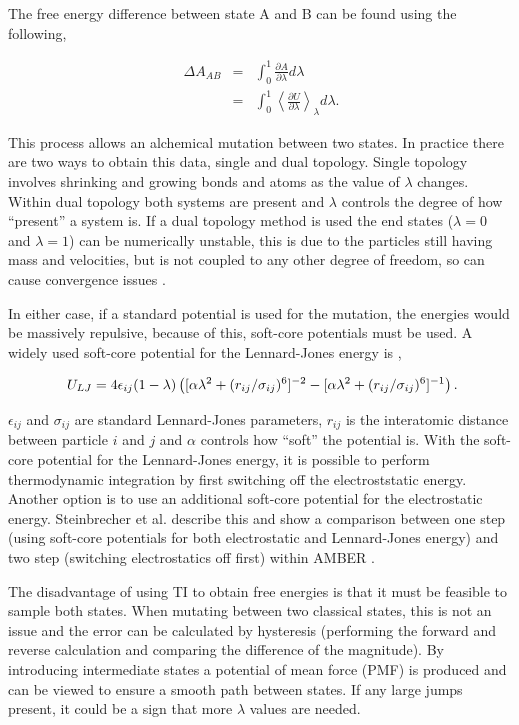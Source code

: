 The free energy difference between state A and B can be found using the following,

\begin{eqnarray}
\ \Delta A_{AB} &=& \int_{0}^{1} \frac{\partial A}{\partial \lambda} d \lambda \\
\ &=& \int_{0}^{1} \left\langle \frac{\partial U}{\partial \lambda} \right\rangle_{\lambda} d \lambda .
\end{eqnarray}

This process allows an alchemical mutation between two states.  In practice there are two ways to obtain this data, single and dual topology.  Single topology involves shrinking and growing bonds and atoms as the value of $\lambda$ changes.  Within dual topology both systems are present and $\lambda$ controls the degree of how ``present'' a system is.  If a dual topology method is used the end states ($\lambda=0$ and $\lambda=1$) can be numerically unstable, this is due to the particles still having mass and velocities, but is not coupled to any other degree of freedom, so can cause convergence issues \cite{Simulate_Phys_world}.

In either case, if a standard potential is used for the mutation, the energies would be massively repulsive, because of this, soft-core potentials must be used.  A widely used soft-core potential for the Lennard-Jones energy is \cite{one_and_two_step_ti},

\begin{equation}
\ U_{LJ} = 4 \epsilon_{ij} (1-\lambda) \left( [\alpha \lambda^2 + (r_{ij}/\sigma_{ij})^6 ] ^{-2}- [ \alpha \lambda^{2} + (r_{ij}/\sigma_{ij})^{6}]^{-1} \right) \\.
\end{equation}

$\epsilon_{ij}$ and $\sigma_{ij}$ are standard Lennard-Jones parameters, $r_{ij}$ is the interatomic distance between particle $i$ and $j$ and $\alpha$ controls how ``soft'' the potential is.  With the soft-core potential for the Lennard-Jones energy, it is possible to perform thermodynamic integration by first switching off the electroststatic energy.  Another option is to use an additional soft-core potential for the electrostatic energy.  Steinbrecher et al. \cite{one_and_two_step_ti} describe this and show a comparison between one step (using soft-core potentials for both electrostatic and Lennard-Jones energy) and two step (switching electrostatics off first) within AMBER \cite{amber_ref}.

The disadvantage of using TI to obtain free energies is that it must be feasible to sample both states.  When mutating between two classical states, this is not an issue and the error can be calculated by hysteresis (performing the forward and reverse calculation and comparing the difference of the magnitude).  By introducing intermediate states a potential of mean force (PMF) is produced and can be viewed to ensure a smooth path between states.  If any large jumps present, it could be a sign that more $\lambda$ values are needed.


